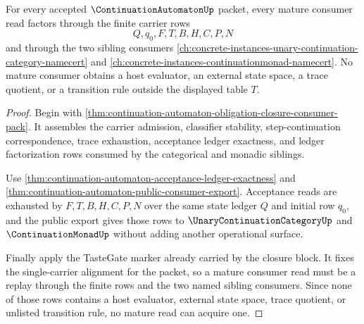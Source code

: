 \begin{theorem}\label{thm:continuation-automaton-mature-consumer-completeness}
For every accepted $\ContinuationAutomatonUp$ packet, every mature consumer read factors through the finite carrier rows
$$
Q,q_0,F,T,B,H,C,P,N
$$
and through the two sibling consumers \autoref{ch:concrete-instances-unary-continuation-category-namecert} and \autoref{ch:concrete-instances-continuationmonad-namecert}. No mature consumer obtains a host evaluator, an external state space, a trace quotient, or a transition rule outside the displayed table $T$.
\end{theorem}
\begin{proof}
Begin with \autoref{thm:continuation-automaton-obligation-closure-consumer-pack}. It assembles the carrier admission, classifier stability, step-continuation correspondence, trace exhaustion, acceptance ledger exactness, and ledger factorization rows consumed by the categorical and monadic siblings.

Use \autoref{thm:continuation-automaton-acceptance-ledger-exactness} and \autoref{thm:continuation-automaton-public-consumer-export}. Acceptance reads are exhausted by $F,T,B,H,C,P,N$ over the same state ledger $Q$ and initial row $q_0$, and the public export gives those rows to $\UnaryContinuationCategoryUp$ and $\ContinuationMonadUp$ without adding another operational surface.

Finally apply the TasteGate marker already carried by the closure block. It fixes the single-carrier alignment for the packet, so a mature consumer read must be a replay through the finite rows and the two named sibling consumers. Since none of those rows contains a host evaluator, external state space, trace quotient, or unlisted transition rule, no mature read can acquire one.
\end{proof}

